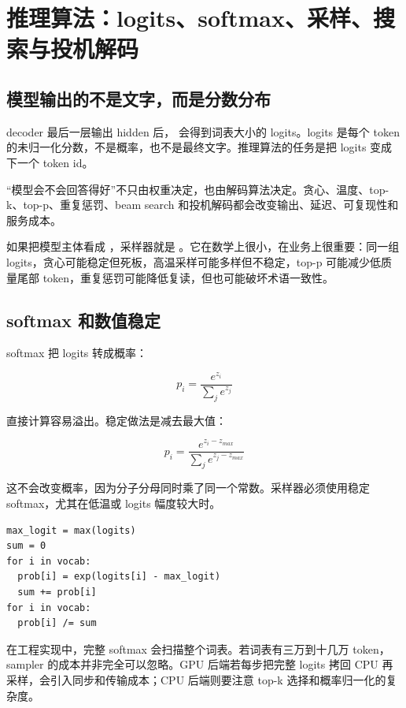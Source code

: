 \section{推理算法：logits、softmax、采样、搜索与投机解码}

\subsection{模型输出的不是文字，而是分数分布}

decoder 最后一层输出 hidden 后， 会得到词表大小的 logits。logits 是每个 token 的未归一化分数，不是概率，也不是最终文字。推理算法的任务是把 logits 变成下一个 token id。

\begin{keyidea}
“模型会不会回答得好”不只由权重决定，也由解码算法决定。贪心、温度、top-k、top-p、重复惩罚、beam search 和投机解码都会改变输出、延迟、可复现性和服务成本。
\end{keyidea}

如果把模型主体看成 ，采样器就是 。它在数学上很小，在业务上很重要：同一组 logits，贪心可能稳定但死板，高温采样可能多样但不稳定，top-p 可能减少低质量尾部 token，重复惩罚可能降低复读，但也可能破坏术语一致性。

\subsection{softmax 和数值稳定}

softmax 把 logits 转成概率：

\[
p_i = \frac{e^{z_i}}{\sum_j e^{z_j}}
\]

直接计算容易溢出。稳定做法是减去最大值：

\[
p_i = \frac{e^{z_i-z_{max}}}{\sum_j e^{z_j-z_{max}}}
\]

这不会改变概率，因为分子分母同时乘了同一个常数。采样器必须使用稳定 softmax，尤其在低温或 logits 幅度较大时。

\begin{lstlisting}[numbers=none,caption={稳定 softmax 伪代码}]
max_logit = max(logits)
sum = 0
for i in vocab:
  prob[i] = exp(logits[i] - max_logit)
  sum += prob[i]
for i in vocab:
  prob[i] /= sum
\end{lstlisting}

在工程实现中，完整 softmax 会扫描整个词表。若词表有三万到十几万 token，sampler 的成本并非完全可以忽略。GPU 后端若每步把完整 logits 拷回 CPU 再采样，会引入同步和传输成本；CPU 后端则要注意 top-k 选择和概率归一化的复杂度。

